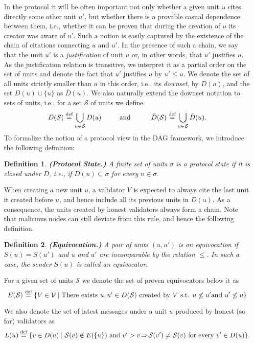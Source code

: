 \documentclass[12pt, fleqn]{article}
\newtheorem{definition}{Definition}
\newcommand{\defeq}{\stackrel{\textup{def}}{=}}
\newcommand{\cS}{\mathcal{S}}
\begin{document}
In the protocol it will be often important not only whether a given unit $u$ cites directly some other unit $u'$, but whether there is a provable casual dependence between them, i.e., whether it can be proven that during the creation of $u$ its creator was aware of $u'$.
%
Such a notion is easily captured by the existence of the chain of citations connecting $u$ and $u'$.
%
In the presence of such a chain, we say that the unit $u'$ is a  \emph{justification} of unit $u$ or, in other words, that $u'$ justifies $u$.
%
As the justification relation is transitive, we interpret it as a partial order on the set of units and denote the fact that $u'$ justifies $u$ by $u'\leq u$.
%
We denote the set of all units strictly smaller than $u$ in this order, i.e., its \emph{downset}, by $D(u)$, and the set $D(u)\cup\{u\}$ as $\bar{D}(u)$.
%
We also naturally extend the downset notation to sets of units, i.e., for a set $\cS$ of units we define
$$D(\cS) \defeq \bigcup_{u\in \cS} D(u)~~~~~~~\mbox{ and }~~~~~~~~\bar{D}(\cS) \defeq \bigcup_{u\in \cS} \bar{D}(u).$$
%
To formalize the notion of a protocol view in the DAG framework, we introduce the following definition:

\begin{definition} {\bf (Protocol State.)}
A finite set of units $\sigma$ is a \emph{protocol state} if it is closed under $D$, i.e., if $D(u)\subseteq \sigma$ for every $u\in\sigma$.
\end{definition}


When creating a new unit $u$, a validator $V$ is expected to always cite the last unit it created before $u$, and hence include all its previous units in $D(u)$.
%
As a consequence, the units created by honest validators always form a chain.
%
Note that malicious nodes can still deviate from this rule, and hence the following definition.

\begin{definition}{\bf (Equivocation.)}
A pair of units $(u,u')$ is an \emph{equivocation} if $S(u)=S(u')$ and $u$ and $u'$ are incomparable by the relation $\leq$. In such a case, the sender $S(u)$ is called an \emph{equivocator}.
\end{definition}


For a given set of units $\cS$ we denote the set of proven equivocators below it as $$E(\cS) \defeq \{V\in \mathcal{V} \mid \text{There exists } u,u'\in D(\cS) \text{ created by } V \text{ s.t. } u\not\leq u' \text{and } u'\not\leq u\}$$

We also denote the set of latest messages under a unit $u$ produced by honest (so far) validators as 
$$L(u) \defeq \{v\in D(u) \mid \cS(v)\notin E(\{u\}) \text{ and } v'>v \!\Rightarrow\! \cS(v')\neq \cS(v) \text{ for every } v'\in D(u)\}.$$
\end{document}

